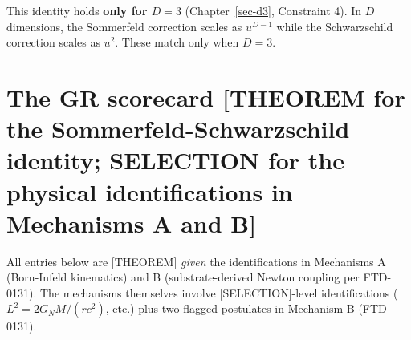 \documentclass[
  11pt,
  letterpaper,
  twoside,
  openany]{book}
\makeatletter
\let\orig@section\section
\renewcommand{\section}{\needspace{8\baselineskip}\orig@section}
\makeatother
\begin{document}
This identity holds \textbf{only for \(D = 3\)} (Chapter~\ref{sec-d3},
Constraint 4). In \(D\) dimensions, the Sommerfeld correction scales as
\(u^{D-1}\) while the Schwarzschild correction scales as \(u^2\). These
match only when \(D = 3\).

\section{The GR scorecard {[}THEOREM for the Sommerfeld-Schwarzschild
identity; SELECTION for the physical identifications in Mechanisms A and
B{]}}\label{the-gr-scorecard-theorem-for-the-sommerfeld-schwarzschild-identity-selection-for-the-physical-identifications-in-mechanisms-a-and-b}

All entries below are {[}THEOREM{]} \emph{given} the identifications in
Mechanisms A (Born-Infeld kinematics) and B (substrate-derived Newton
coupling per FTD-0131). The mechanisms themselves involve
{[}SELECTION{]}-level identifications (\(L^2 = 2G_NM/(rc^2)\), etc.)
plus two flagged postulates in Mechanism B (FTD-0131).
\end{document}
